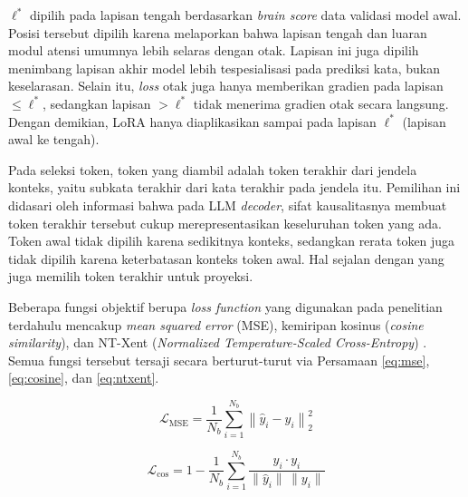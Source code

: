 $\ell^*$ dipilih pada lapisan tengah berdasarkan \textit{brain score} data validasi model awal. Posisi tersebut dipilih karena \textcite{xiao2026beyond} melaporkan bahwa lapisan tengah dan luaran modul atensi umumnya lebih selaras dengan otak. Lapisan ini juga dipilih menimbang lapisan akhir model lebih tespesialisasi pada prediksi kata, bukan keselarasan. Selain itu, \textit{loss} otak juga hanya memberikan gradien pada lapisan $\le \ell^*$, sedangkan lapisan $> \ell^*$ tidak menerima gradien otak secara langsung. Dengan demikian, LoRA hanya diaplikasikan sampai pada lapisan $\ell^*$ (lapisan awal ke tengah).

Pada seleksi token, token yang diambil adalah token terakhir dari jendela konteks, yaitu subkata terakhir dari kata terakhir pada jendela itu. Pemilihan ini didasari oleh informasi bahwa pada LLM \textit{decoder}, sifat kausalitasnya membuat token terakhir tersebut cukup merepresentasikan keseluruhan token yang ada. Token awal tidak dipilih karena sedikitnya konteks, sedangkan rerata token juga tidak dipilih karena keterbatasan konteks token awal. Hal sejalan dengan \textcites{mischler2024contextual}{negi2025brain}{xiao2026beyond} yang juga memilih token terakhir untuk proyeksi. 
 
Beberapa fungsi objektif berupa \textit{loss function} yang digunakan pada penelitian terdahulu mencakup \textit{mean squared error} (MSE), kemiripan kosinus (\textit{cosine similarity}), dan NT-Xent (\textit{Normalized Temperature-Scaled Cross-Entropy}) \autocite{chen2020simple}. Semua fungsi tersebut tersaji secara berturut-turut via Persamaan \ref{eq:mse}, \ref{eq:cosine}, dan \ref{eq:ntxent}.
 
\begin{equation}
  \mathcal{L}_{\text{MSE}} = \frac{1}{N_b}\sum_{i=1}^{N_b}\left\lVert \hat{y}_i - y_i \right\rVert_2^{2}
  \label{eq:mse}
\end{equation}
 
\begin{equation}
  \mathcal{L}_{\text{cos}} = 1 - \frac{1}{N_b}\sum_{i=1}^{N_b}\frac{\hat{y}_i \cdot y_i}{\lVert \hat{y}_i \rVert\,\lVert y_i \rVert}
  \label{eq:cosine}
\end{equation}
 
